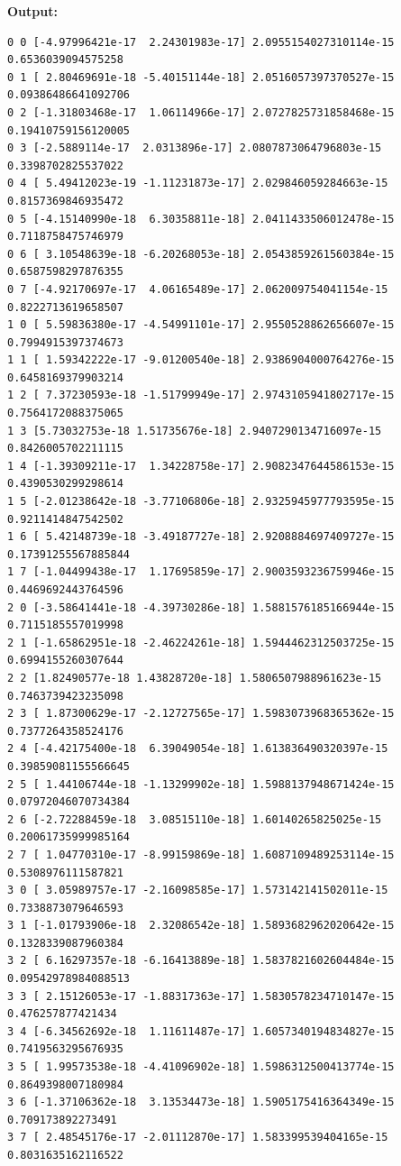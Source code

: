 \documentclass{article}
\begin{document}
\textbf{Output:}\begin{verbatim}
0 0 [-4.97996421e-17  2.24301983e-17] 2.0955154027310114e-15 0.6536039094575258
0 1 [ 2.80469691e-18 -5.40151144e-18] 2.0516057397370527e-15 0.09386486641092706
0 2 [-1.31803468e-17  1.06114966e-17] 2.0727825731858468e-15 0.19410759156120005
0 3 [-2.5889114e-17  2.0313896e-17] 2.0807873064796803e-15 0.3398702825537022
0 4 [ 5.49412023e-19 -1.11231873e-17] 2.029846059284663e-15 0.8157369846935472
0 5 [-4.15140990e-18  6.30358811e-18] 2.0411433506012478e-15 0.7118758475746979
0 6 [ 3.10548639e-18 -6.20268053e-18] 2.0543859261560384e-15 0.6587598297876355
0 7 [-4.92170697e-17  4.06165489e-17] 2.062009754041154e-15 0.8222713619658507
1 0 [ 5.59836380e-17 -4.54991101e-17] 2.9550528862656607e-15 0.7994915397374673
1 1 [ 1.59342222e-17 -9.01200540e-18] 2.9386904000764276e-15 0.6458169379903214
1 2 [ 7.37230593e-18 -1.51799949e-17] 2.9743105941802717e-15 0.7564172088375065
1 3 [5.73032753e-18 1.51735676e-18] 2.9407290134716097e-15 0.8426005702211115
1 4 [-1.39309211e-17  1.34228758e-17] 2.9082347644586153e-15 0.4390530299298614
1 5 [-2.01238642e-18 -3.77106806e-18] 2.9325945977793595e-15 0.9211414847542502
1 6 [ 5.42148739e-18 -3.49187727e-18] 2.9208884697409727e-15 0.17391255567885844
1 7 [-1.04499438e-17  1.17695859e-17] 2.9003593236759946e-15 0.4469692443764596
2 0 [-3.58641441e-18 -4.39730286e-18] 1.5881576185166944e-15 0.7115185557019998
2 1 [-1.65862951e-18 -2.46224261e-18] 1.5944462312503725e-15 0.6994155260307644
2 2 [1.82490577e-18 1.43828720e-18] 1.5806507988961623e-15 0.7463739423235098
2 3 [ 1.87300629e-17 -2.12727565e-17] 1.5983073968365362e-15 0.7377264358524176
2 4 [-4.42175400e-18  6.39049054e-18] 1.613836490320397e-15 0.39859081155566645
2 5 [ 1.44106744e-18 -1.13299902e-18] 1.5988137948671424e-15 0.07972046070734384
2 6 [-2.72288459e-18  3.08515110e-18] 1.60140265825025e-15 0.20061735999985164
2 7 [ 1.04770310e-17 -8.99159869e-18] 1.6087109489253114e-15 0.5308976111587821
3 0 [ 3.05989757e-17 -2.16098585e-17] 1.573142141502011e-15 0.7338873079646593
3 1 [-1.01793906e-18  2.32086542e-18] 1.5893682962020642e-15 0.1328339087960384
3 2 [ 6.16297357e-18 -6.16413889e-18] 1.5837821602604484e-15 0.09542978984088513
3 3 [ 2.15126053e-17 -1.88317363e-17] 1.5830578234710147e-15 0.476257877421434
3 4 [-6.34562692e-18  1.11611487e-17] 1.6057340194834827e-15 0.7419563295676935
3 5 [ 1.99573538e-18 -4.41096902e-18] 1.5986312500413774e-15 0.8649398007180984
3 6 [-1.37106362e-18  3.13534473e-18] 1.5905175416364349e-15 0.709173892273491
3 7 [ 2.48545176e-17 -2.01112870e-17] 1.583399539404165e-15 0.8031635162116522

\end{verbatim}
\end{document}
